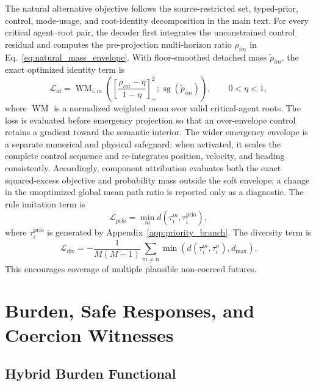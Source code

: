 \documentclass[10pt]{article}
\begin{document}
The natural alternative objective follows the source-restricted set, typed-prior, control, mode-usage, and root-identity decomposition in the main text. For every critical agent--root pair, the decoder first integrates the unconstrained control residual and computes the pre-projection multi-horizon ratio $\rho_{im}$ in Eq.~\eqref{eq:natural_mass_envelope}. With floor-smoothed detached mass $\widetilde p_{im}$, the exact optimized identity term is
\begin{equation}
    \mathcal{L}_{\mathrm{id}}
    =
    \operatorname{WM}_{i,m}
    \left(
      \left[
        \frac{\rho_{im}-\eta}{1-\eta}
      \right]_+^2;
      \operatorname{sg}(\widetilde p_{im})
    \right),
    \qquad 0<\eta<1,
\end{equation}
where $\operatorname{WM}$ is a normalized weighted mean over valid critical-agent roots. The loss is evaluated before emergency projection so that an over-envelope control retains a gradient toward the semantic interior. The wider emergency envelope is a separate numerical and physical safeguard: when activated, it scales the complete control sequence and re-integrates position, velocity, and heading consistently. Accordingly, component attribution evaluates both the exact squared-excess objective and probability mass outside the soft envelope; a change in the unoptimized global mean path ratio is reported only as a diagnostic.
The rule imitation term is
\begin{equation}
    \mathcal{L}_{\mathrm{prio}}
    =
    \min_m
    d(\tau_i^m,\tau_i^{\mathrm{prio}}),
\end{equation}
where $\tau_i^{\mathrm{prio}}$ is generated by Appendix~\ref{app:priority_branch}. The diversity term is
\begin{equation}
    \mathcal{L}_{\mathrm{div}}
    =
    -
    \frac{1}{M(M-1)}
    \sum_{m\neq n}
    \min
    \left(
    d(\tau_i^m,\tau_i^n),
    d_{\max}
    \right).
\end{equation}
This encourages coverage of multiple plausible non-coerced futures.

\section{Burden, Safe Responses, and Coercion Witnesses}
\label{app:burden_witness}

\subsection{Hybrid Burden Functional}
\label{app:burden}
\end{document}
